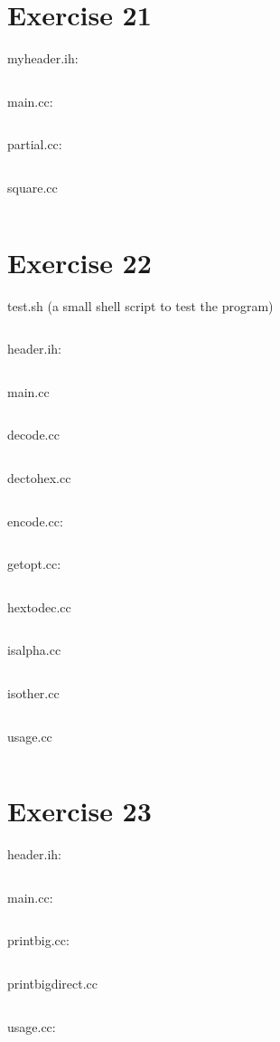 \documentclass{article}[10pt]
\begin{document}
 

\section*{Exercise 21}
 
 

 
myheader.ih:
\inputminted[linenos=true, bgcolor=cppbg, tabsize=4 , frame=lines]{cpp}{../21/myheader.ih}
main.cc:
\inputminted[linenos=true, bgcolor=cppbg, tabsize=4 , frame=lines]{cpp}{../21/main.cc}
partial.cc:
\inputminted[linenos=true, bgcolor=cppbg, tabsize=4 , frame=lines]{cpp}{../21/partial.cc}
square.cc
\inputminted[linenos=true, bgcolor=cppbg, tabsize=4 , frame=lines]{cpp}{../21/square.cc}
 

\section*{Exercise 22}
 
 

 
test.sh (a small shell script to test the program)
\inputminted[linenos=true, bgcolor=cppbg, tabsize=4 , frame=lines]{bash}{../22/test.sh}
header.ih:
\inputminted[linenos=true, bgcolor=cppbg, tabsize=4 , frame=lines]{cpp}{../22/header.ih}
main.cc
\inputminted[linenos=true, bgcolor=cppbg, tabsize=4 , frame=lines]{cpp}{../22/main.cc}
decode.cc
\inputminted[linenos=true, bgcolor=cppbg, tabsize=4 , frame=lines]{cpp}{../22/decode.cc}
dectohex.cc
\inputminted[linenos=true, bgcolor=cppbg, tabsize=4 , frame=lines]{cpp}{../22/dectohex.cc}
encode.cc:
\inputminted[linenos=true, bgcolor=cppbg, tabsize=4 , frame=lines]{cpp}{../22/encode.cc}
getopt.cc:
\inputminted[linenos=true, bgcolor=cppbg, tabsize=4 , frame=lines]{cpp}{../22/getopt.cc}
hextodec.cc
\inputminted[linenos=true, bgcolor=cppbg, tabsize=4 , frame=lines]{cpp}{../22/hextodec.cc}
isalpha.cc
\inputminted[linenos=true, bgcolor=cppbg, tabsize=4 , frame=lines]{cpp}{../22/isalpha.cc}
isother.cc
\inputminted[linenos=true, bgcolor=cppbg, tabsize=4 , frame=lines]{cpp}{../22/isother.cc}
usage.cc
\inputminted[linenos=true, bgcolor=cppbg, tabsize=4 , frame=lines]{cpp}{../22/usage.cc}
 

\section*{Exercise 23}

 
 

 
header.ih:
\inputminted[linenos=true, bgcolor=cppbg, tabsize=4 , frame=lines]{cpp}{../23/header.ih}
main.cc:
\inputminted[linenos=true, bgcolor=cppbg, tabsize=4 , frame=lines]{cpp}{../23/main.cc}
printbig.cc:
\inputminted[linenos=true, bgcolor=cppbg, tabsize=4 , frame=lines]{cpp}{../23/printbig.cc}
printbigdirect.cc
\inputminted[linenos=true, bgcolor=cppbg, tabsize=4 , frame=lines]{cpp}{../23/printbigdirect.cc}
usage.cc:
\inputminted[linenos=true, bgcolor=cppbg, tabsize=4 , frame=lines]{cpp}{../23/usage.cc}

 
\end{document}
